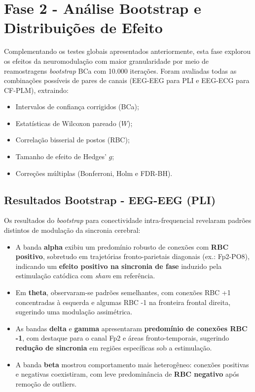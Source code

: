 \section{Fase 2 - Análise Bootstrap e Distribuições de Efeito}

Complementando os testes globais apresentados anteriormente, esta fase explorou os efeitos da neuromodulação com maior granularidade por meio de reamostragens \textit{bootstrap} BCa com 10.000 iterações. Foram avaliadas todas as combinações possíveis de pares de canais (EEG-EEG para PLI e EEG-ECG para CF-PLM), extraindo:
\begin{itemize}
  \item Intervalos de confiança corrigidos (BCa);
  \item Estatísticas de Wilcoxon pareado ($W$);
  \item Correlação bisserial de postos (RBC);
  \item Tamanho de efeito de Hedges' $g$;
  \item Correções múltiplas (Bonferroni, Holm e FDR-BH).
\end{itemize}

\subsection{Resultados Bootstrap - EEG-EEG (PLI)}

Os resultados do \textit{bootstrap} para conectividade intra-frequencial revelaram padrões distintos de modulação da sincronia cerebral:
\begin{itemize}
  \item A banda \textbf{alpha} exibiu um predomínio robusto de conexões com \textbf{RBC positivo}, sobretudo em trajetórias fronto-parietais diagonais (ex.: Fp2-PO8), indicando um \textbf{efeito positivo na sincronia de fase} induzido pela estimulação catódica com \textit{sham} em referência.
  \item Em \textbf{theta}, observaram-se padrões semelhantes, com conexões RBC +1 concentradas à esquerda e algumas RBC -1 na fronteira frontal direita, sugerindo uma modulação assimétrica.
  \item As bandas \textbf{delta} e \textbf{gamma} apresentaram \textbf{predomínio de conexões RBC -1}, com destaque para o canal Fp2 e áreas fronto-temporais, sugerindo \textbf{redução de sincronia} em regiões específicas sob a estimulação.
  \item A banda \textbf{beta} mostrou comportamento mais heterogêneo: conexões positivas e negativas coexistiram, com leve predominância de \textbf{RBC negativo} após remoção de outliers.
\end{itemize}

